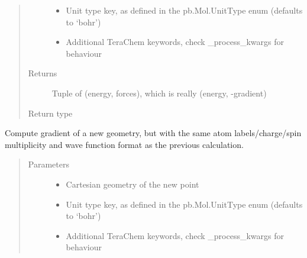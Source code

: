\documentclass[letterpaper,10pt,english]{sphinxmanual}
\begin{document}
\begin{fulllineitems}
\begin{fulllineitems}
\begin{quote}
\begin{description}
\begin{itemize}
\item {} 
 \textendash{} Unit type key, as defined in the pb.Mol.UnitType enum (defaults to ‘bohr’)

\item {} 
 \textendash{} Additional TeraChem keywords, check \_process\_kwargs for behaviour

\end{itemize}

\item[{Returns}] \leavevmode
Tuple of (energy, forces), which is really (energy, -gradient)

\item[{Return type}] \leavevmode
{}

\end{description}\end{quote}

\end{fulllineitems}


\begin{fulllineitems}
\label{\detokenize{tcpb:tcpb.tcpb.TCProtobufClient.compute_gradient}}
Compute gradient of a new geometry, but with the same atom labels/charge/spin
multiplicity and wave function format as the previous calculation.
\begin{quote}\begin{description}
\item[{Parameters}] \leavevmode\begin{itemize}
\item {} 
 \textendash{} Cartesian geometry of the new point

\item {} 
 \textendash{} Unit type key, as defined in the pb.Mol.UnitType enum (defaults to ‘bohr’)

\item {} 
 \textendash{} Additional TeraChem keywords, check \_process\_kwargs for behaviour

\end{itemize}


\end{description}
\end{quote}
\end{fulllineitems}
\end{fulllineitems}
\end{document}
